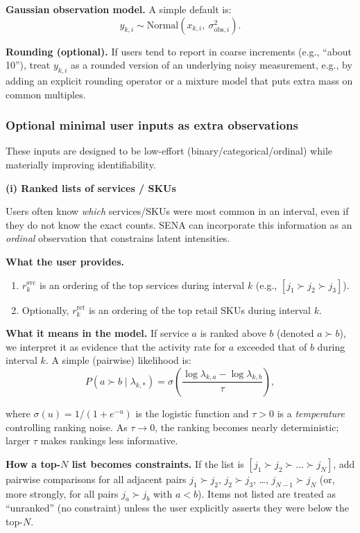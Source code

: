\documentclass[11pt]{article}
\begin{document}
\textbf{Gaussian observation model.} A simple default is:
\[
  y_{k,i} \sim \text{Normal}(x_{k,i},\ \sigma^2_{\text{obs},i}).
\]

\textbf{Rounding (optional).} If users tend to report in coarse increments (e.g., ``about 10''), treat $y_{k,i}$ as a rounded version of an underlying noisy measurement, e.g., by adding an explicit rounding operator or a mixture model that puts extra mass on common multiples.

\subsubsection*{Optional minimal user inputs as extra observations}

These inputs are designed to be low-effort (binary/categorical/ordinal) while materially improving identifiability.

\textbf{(i) Ranked lists of services / SKUs}

Users often know \emph{which} services/SKUs were most common in an interval, even if they do not know the exact counts.
SENA can incorporate this information as an \emph{ordinal} observation that constrains latent intensities.

\textbf{What the user provides.}
\begin{enumerate}
  \item $r^{\mathrm{svc}}_k$ is an ordering of the top services during interval $k$ (e.g., $[j_1 \succ j_2 \succ j_3]$).
  \item Optionally, $r^{\mathrm{ret}}_k$ is an ordering of the top retail SKUs during interval $k$.
\end{enumerate}

\textbf{What it means in the model.} If service $a$ is ranked above $b$ (denoted $a\succ b$), we interpret it as evidence that the activity rate for $a$ exceeded that of $b$ during interval $k$.
A simple (pairwise) likelihood is:
\[
  P(a \succ b \mid \lambda_{k,*}) = \sigma\!\left(\frac{\log \lambda_{k,a} - \log \lambda_{k,b}}{\tau}\right),
\]

where $\sigma(u)=1/(1+e^{-u})$ is the logistic function and $\tau>0$ is a \emph{temperature} controlling ranking noise.
As $\tau\to 0$, the ranking becomes nearly deterministic; larger $\tau$ makes rankings less informative.

\textbf{How a top-$N$ list becomes constraints.} If the list is $[j_1 \succ j_2 \succ \dots \succ j_N]$, add pairwise comparisons for all adjacent pairs $j_1\succ j_2$, $j_2\succ j_3$, \dots, $j_{N-1}\succ j_N$ (or, more strongly, for all pairs $j_a\succ j_b$ with $a<b$).
Items not listed are treated as ``unranked'' (no constraint) unless the user explicitly asserts they were below the top-$N$.
\end{document}
